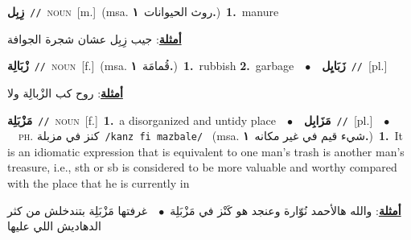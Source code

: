 \documentclass[10pt,a4paper,twoside]{article} %
\begin{document}
\begin{multicols}{2}
{{{{{{{{\setlength\topsep{0pt}\textbf{\foreignlanguage{arabic}{زِبِل}}\ {\color{gray}\texttt{//}\color{black}}\ \textsc{noun}\ [m.]\ \color{gray}(msa. \foreignlanguage{arabic}{روث الحيوانات}~\foreignlanguage{arabic}{\textbf{١.}})\color{black}\ \textbf{1.}~manure\  \begin{flushright}\color{gray}\foreignlanguage{arabic}{\textbf{\underline{\foreignlanguage{arabic}{أمثلة}}}: جيب زِبِل عشان شجرة الجوافة}\end{flushright}\color{black}} \vspace{2mm}

{\setlength\topsep{0pt}\textbf{\foreignlanguage{arabic}{زْبَالِة}}\ {\color{gray}\texttt{//}\color{black}}\ \textsc{noun}\ [f.]\ \color{gray}(msa. \foreignlanguage{arabic}{قُمامَة}~\foreignlanguage{arabic}{\textbf{١.}})\color{black}\ \textbf{1.}~rubbish  \textbf{2.}~garbage\ \ $\bullet$\ \ \setlength\topsep{0pt}\textbf{\foreignlanguage{arabic}{زَبَايِل}}\ {\color{gray}\texttt{//}\color{black}}\ [pl.]\  \begin{flushright}\color{gray}\foreignlanguage{arabic}{\textbf{\underline{\foreignlanguage{arabic}{أمثلة}}}: روح كب الزْبالِة ولا}\end{flushright}\color{black}} \vspace{2mm}

{\setlength\topsep{0pt}\textbf{\foreignlanguage{arabic}{مَزْبَلِة}}\ {\color{gray}\texttt{//}\color{black}}\ \textsc{noun}\ [f.]\ \textbf{1.}~a disorganized and untidy place\ \ $\bullet$\ \ \setlength\topsep{0pt}\textbf{\foreignlanguage{arabic}{مَزَابِل}}\ {\color{gray}\texttt{//}\color{black}}\ [pl.]\ \ $\bullet$\ \ \textsc{ph.} \color{gray} \foreignlanguage{arabic}{كنز في مزبلة}\color{black}\ {\color{gray}\texttt{/{\sffamily kanz fi mazbale}/}\color{black}}\ \color{gray} (msa. \foreignlanguage{arabic}{شيء قيم في غير مكانه}~\foreignlanguage{arabic}{\textbf{١.}})\color{black}\ \textbf{1.}~It is an idiomatic expression that is equivalent to one man's trash is another man's treasure, i.e., sth or sb is considered to be more valuable and worthy compared with the place that he is currently in\  \begin{flushright}\color{gray}\foreignlanguage{arabic}{\textbf{\underline{\foreignlanguage{arabic}{أمثلة}}}: والله هالأحمد نُوّارة وعنجد هو كَنْز في مَزْبَلِة\ $\bullet$\ \  غرفتها مَزْبَلِة بتندخلش من كثر الدهاديش اللي عليها}\end{flushright}\color{black}} \vspace{2mm}

}}}}}}}
\end{multicols}
\end{document}
